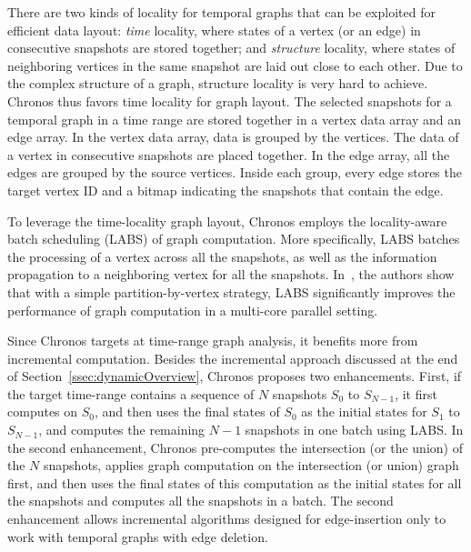 \documentclass{svjour3}
\begin{document}
 There are two kinds of locality for temporal graphs that can be exploited for efficient data layout: \emph{time} locality, where states of a vertex (or an edge) in consecutive snapshots are stored together; and \emph{structure} locality, where states of neighboring vertices in the same snapshot are laid out close to each other. Due to the complex structure of a graph, structure locality is very hard to achieve. Chronos thus favors time locality for graph layout. The selected snapshots for a temporal graph in a time range are stored together in a vertex data array and an edge array. In the vertex data array, data is grouped by the vertices. The data of a vertex in consecutive snapshots are placed together. In the edge array, all the edges are grouped by the source vertices. Inside each group, every edge stores the target vertex ID and a bitmap indicating the snapshots that contain the edge. 

\vspace{2mm}

 To leverage the time-locality graph layout, Chronos employs the locality-aware batch scheduling (LABS) of graph computation. More specifically, LABS batches the processing of a vertex across all the snapshots, as well as the information propagation to a neighboring vertex for all the snapshots. %
In~\cite{han2014chronos}, the authors show that with a simple partition-by-vertex strategy, LABS significantly improves the performance of graph computation in a multi-core parallel setting.

\vspace{2mm}

 Since Chronos targets at time-range graph analysis, it benefits more from incremental computation. Besides the incremental approach discussed at the end of Section~\ref{ssec:dynamicOverview}, Chronos proposes two enhancements. First, if the target time-range contains a sequence of $N$ snapshots $S_0$ to $S_{N-1}$, it first computes on $S_0$, and then uses the final states of $S_0$ as the initial states for $S_1$ to $S_{N-1}$, and computes the remaining $N-1$ snapshots in one batch using LABS. In the second enhancement, Chronos pre-computes the intersection (or the union) of the $N$ snapshots, applies graph computation on the intersection (or union) graph first, and then uses the final states of this computation as the initial states for all the snapshots and computes all the snapshots in a batch. The second enhancement allows incremental algorithms designed for edge-insertion only to work with temporal graphs with edge deletion.
\end{document}
